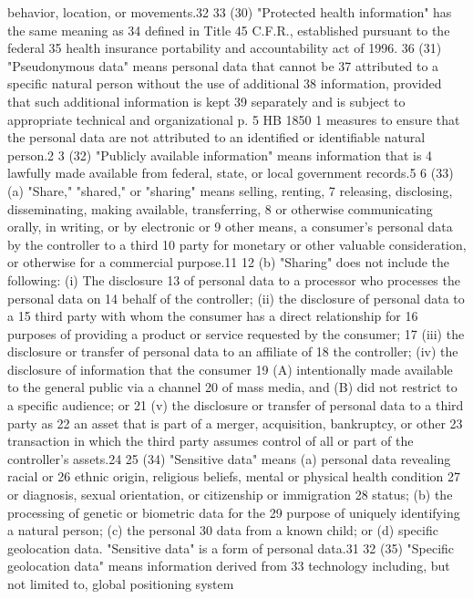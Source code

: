 behavior, location, or movements.32
33 (30) "Protected health information" has the same meaning as
34 defined in Title 45 C.F.R., established pursuant to the federal
35 health insurance portability and accountability act of 1996.
36 (31) "Pseudonymous data" means personal data that cannot be
37 attributed to a specific natural person without the use of additional
38 information, provided that such additional information is kept
39 separately and is subject to appropriate technical and organizational
p. 5 HB 1850
1 measures to ensure that the personal data are not attributed to an
identified or identifiable natural person.2
3 (32) "Publicly available information" means information that is
4 lawfully made available from federal, state, or local government
records.5
6 (33)(a) "Share," "shared," or "sharing" means selling, renting,
7 releasing, disclosing, disseminating, making available, transferring,
8 or otherwise communicating orally, in writing, or by electronic or
9 other means, a consumer's personal data by the controller to a third
10 party for monetary or other valuable consideration, or otherwise for
a commercial purpose.11
12 (b) "Sharing" does not include the following: (i) The disclosure
13 of personal data to a processor who processes the personal data on
14 behalf of the controller; (ii) the disclosure of personal data to a
15 third party with whom the consumer has a direct relationship for
16 purposes of providing a product or service requested by the consumer;
17 (iii) the disclosure or transfer of personal data to an affiliate of
18 the controller; (iv) the disclosure of information that the consumer
19 (A) intentionally made available to the general public via a channel
20 of mass media, and (B) did not restrict to a specific audience; or
21 (v) the disclosure or transfer of personal data to a third party as
22 an asset that is part of a merger, acquisition, bankruptcy, or other
23 transaction in which the third party assumes control of all or part
of the controller's assets.24
25 (34) "Sensitive data" means (a) personal data revealing racial or
26 ethnic origin, religious beliefs, mental or physical health condition
27 or diagnosis, sexual orientation, or citizenship or immigration
28 status; (b) the processing of genetic or biometric data for the
29 purpose of uniquely identifying a natural person; (c) the personal
30 data from a known child; or (d) specific geolocation data. "Sensitive
data" is a form of personal data.31
32 (35) "Specific geolocation data" means information derived from
33 technology including, but not limited to, global positioning system
